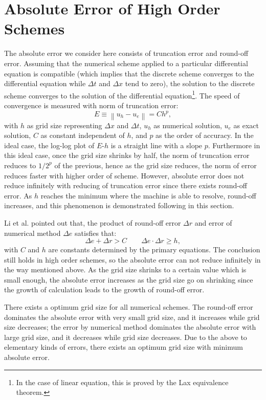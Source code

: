 \documentclass[]{article}
\def\aabs#1{\left\|#1\right\|}
\begin{document}
\section{Absolute Error of High Order Schemes} \label{sec:abserr-high-order}
The absolute error we consider here consists of truncation error and round-off
error.
Assuming that the numerical scheme applied to a particular differential equation is
compatible (which implies that the discrete scheme converges to the
differential equation while
$\Delta t$ and $\Delta x$ tend to zero), the solution to the discrete scheme
converges to the solution of the differential equation\footnote{In the
case of linear equation, this is proved by the Lax equivalence theorem\cite{lax1956survey}.}.
The speed of convergence is measured with norm of truncation error:
\begin{equation}
E\equiv\aabs{u_h-u_e} = Ch^p,
\label{eq:error-norm}
\end{equation}
with $h$ as grid size representing $\Delta x$ and $\Delta t$, $u_h$ as numerical
solution, $u_e$ as exact solution, $C$ as constant independent of $h$, and
$p$ as the order of accuracy. In the ideal case, the log-log plot of
$E$-$h$ is a straight line with a slope $p$. Furthermore in this ideal case,
once the grid size shrinks by half, the norm of truncation error reduces to $1/2^p$ of the
previous, hence as the grid size reduces, the norm of error reduces faster with
higher order of scheme. However, absolute error does not reduce infinitely with
reducing of truncation error since there exists round-off error. As $h$ reaches
the minimum where the machine is able to resolve, round-off increases, and
this phenomenon is demonstrated following in this section.

Li et al.\cite{li2001computational} pointed out that, the product
of round-off error $\Delta r$ and error of numerical method $\Delta e$
satisfies that:
\begin{equation}
\Delta e + \Delta r > C \qquad \Delta e \cdot \Delta r \geq h,
\end{equation}
with $C$ and $h$ are constants determined by the primary
equations. The conclusion still holds in high order schemes, so the
absolute error can not reduce infinitely in the way mentioned above. As
the grid size shrinks to a certain value which is small enough, the
absolute error increases as the grid size go on shrinking since the
growth of calculation leads to the growth of round-off error.

There exists a optimum grid size for all numerical schemes. The
round-off error dominates the absolute error with very small grid
size, and it increases while grid size decreases; the error by
numerical method dominates the absolute error with large grid size,
and it decreases while grid size decreases. Due to the above to
elementary kinds of errors, there exists an optimum grid size with
minimum absolute error. 
\end{document}
